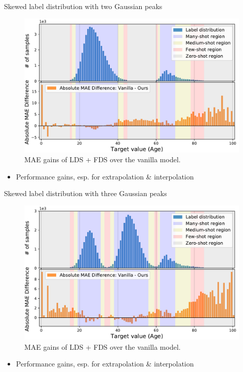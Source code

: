 \begin{frame}{Skewed label distribution with two Gaussian peaks}
	\begin{figure}[h]
		\includegraphics[width=0.7\linewidth]{images/interp_extrap_diff_peak2.pdf}
		\caption{MAE gains of LDS + FDS over the vanilla model.}
	\end{figure}
	\begin{itemize}
		\item Performance gains, esp. for extrapolation \& interpolation
	\end{itemize}
\end{frame}

\begin{frame}{Skewed label distribution with three Gaussian peaks}
	\begin{figure}[h]
		\includegraphics[width=0.7\linewidth]{images/interp_extrap_diff_peak3.pdf}
		\caption{MAE gains of LDS + FDS over the vanilla model.}
	\end{figure}
	\begin{itemize}
		\item Performance gains, esp. for extrapolation \& interpolation
	\end{itemize}
\end{frame}

